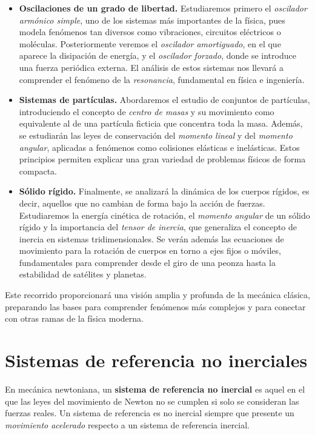 \documentclass[a4paper,12pt]{article}
\begin{document}
\begin{itemize}
    \item \textbf{Oscilaciones de un grado de libertad.} 
    Estudiaremos primero el \emph{oscilador armónico simple}, uno de los sistemas más importantes de la física, pues modela fenómenos tan diversos como vibraciones, circuitos eléctricos o moléculas. Posteriormente veremos el \emph{oscilador amortiguado}, en el que aparece la disipación de energía, y el \emph{oscilador forzado}, donde se introduce una fuerza periódica externa. El análisis de estos sistemas nos llevará a comprender el fenómeno de la \emph{resonancia}, fundamental en física e ingeniería.

    \item \textbf{Sistemas de partículas.} 
    Abordaremos el estudio de conjuntos de partículas, introduciendo el concepto de \emph{centro de masas} y su movimiento como equivalente al de una partícula ficticia que concentra toda la masa. Además, se estudiarán las leyes de conservación del \emph{momento lineal} y del \emph{momento angular}, aplicadas a fenómenos como colisiones elásticas e inelásticas. Estos principios permiten explicar una gran variedad de problemas físicos de forma compacta.

    \item \textbf{Sólido rígido.} 
    Finalmente, se analizará la dinámica de los cuerpos rígidos, es decir, aquellos que no cambian de forma bajo la acción de fuerzas. Estudiaremos la energía cinética de rotación, el \emph{momento angular} de un sólido rígido y la importancia del \emph{tensor de inercia}, que generaliza el concepto de inercia en sistemas tridimensionales. Se verán además las ecuaciones de movimiento para la rotación de cuerpos en torno a ejes fijos o móviles, fundamentales para comprender desde el giro de una peonza hasta la estabilidad de satélites y planetas.
\end{itemize}

Este recorrido proporcionará una visión amplia y profunda de la mecánica clásica, preparando las bases para comprender fenómenos más complejos y para conectar con otras ramas de la física moderna.

\newpage

\section{Sistemas de referencia no inerciales}

En mecánica newtoniana, un \textbf{ sistema de referencia no inercial} es aquel en el que las leyes del movimiento de Newton no se cumplen si solo se consideran las fuerzas reales.  
Un sistema de referencia es no inercial siempre que presente un \emph{movimiento acelerado} respecto a un sistema de referencia inercial.  
\end{document}
